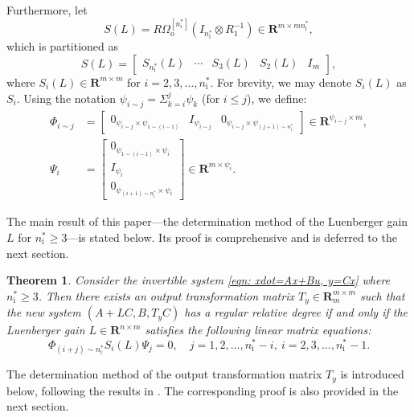 \documentclass[sort&compress]{elsarticle}
\newtheorem{theorem}{Theorem}
\newcommand\nsharp{n_\mathrm i^*}
\newcommand\Pio{\mathit\Omega_\mathrm o}
\newcommand\R{\mathbf R}
\newcommand\PHi{\mathit\Phi}
\newcommand\PSi{\mathit\Psi}
\begin{document}
Furthermore, let
\begin{equation}\label{eqn: define S}
S(L) = R \Pio^{[\nsharp]} (I_{\nsharp} \otimes R_1^{-1})
\in \R^{m \times m\nsharp},
\end{equation}
which is partitioned as
\begin{equation}\label{eqn: partition S}
S(L) = \begin{bmatrix}
S_{\nsharp}(L) & \cdots & S_3(L) & S_2(L) & I_m
\end{bmatrix},
\end{equation}
where $S_i(L) \in \R^{m \times m}$ for $i=2,3,\dots,\nsharp$.
For brevity, we may denote $S_i(L)$ as $S_i$.
Using the notation $\psi_{i \sim j} = \Sigma_{k=i}^j \psi_k$ (for $i \le j$),
we define:
\begin{align*}
\PHi_{i \sim j}
&= \begin{bmatrix}
0_{\psi_{i \sim j} \times \psi_{1 \sim (i-1)}}
& I_{\psi_{i \sim j}}
& 0_{\psi_{i \sim j} \times \psi_{(j+1) \sim \nsharp}}
\end{bmatrix} \in \R^{\psi_{i \sim j} \times m},\\
\PSi_{i}
&= \begin{bmatrix}
0_{\psi_{1 \sim (i-1)} \times \psi_i} \\
I_{\psi_i} \\
0_{\psi_{(i+1) \sim \nsharp} \times \psi_i}
\end{bmatrix} \in \R^{m \times \psi_{i}}.
\end{align*}

The main result of this paper---the determination method of
the Luenberger gain $L$ for $\nsharp \ge 3$---is stated below.
Its proof is comprehensive and is deferred to the next section.

\begin{theorem}\label{thm: theorem}
Consider the invertible system \eqref{eqn: xdot=Ax+Bu, y=Cx}
where $\nsharp \ge 3$.
Then there exists an output transformation matrix $T_y \in \R^{m \times m}_m$
such that the
new system $(A+LC, B, T_yC)$
has a regular relative degree if and only if
the Luenberger gain $L \in \R^{n \times m}$ satisfies
the following linear matrix equations:
\begin{equation}\label{eqn: main result}
\PHi_{(i+j)\sim \nsharp} S_i(L) \PSi_{j} = 0,\quad
j=1,2,\dots,\nsharp-i,\
i=2,3,\dots,\nsharp-1.
\end{equation}
\end{theorem}

The determination method of the output transformation matrix $T_y$
is introduced below, following the results in \cite{Cao2025rrdref[J]}.
The corresponding proof is also provided in the next section.
\end{document}

